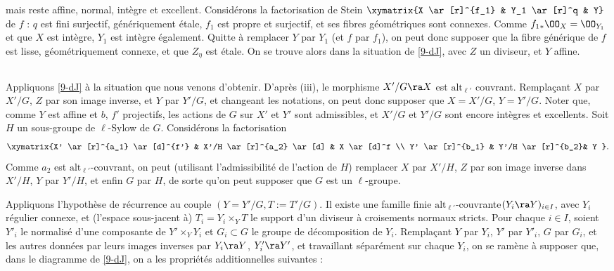 \documentclass[10pt]{../fichiers-configuration-latex/smfart}
\begin{document}
mais reste affine, normal, intègre et excellent. Considérons la factorisation de Stein $\xymatrix{X
\ar[r]^{f_1} & Y_1 \ar[r]^q & Y}$ de $f$ : $q$ est fini surjectif, génériquement étale, $f_1$ est
propre et surjectif, et ses fibres géométriques sont connexes. Comme $f_1{}_*\OO_X =
\OO_{Y_1}$ et que $X$ est intègre, $Y_1$ est intègre également. Quitte à remplacer $Y$ par
$Y_1$ (et $f$ par $f_1$), on peut donc supposer que la fibre générique de $f$ est lisse,
géométriquement connexe, et que $Z_{\eta}$ est étale. On se trouve alors dans la situation de
\ref{9-dJ}, avec $Z$ un diviseur, et $Y$ affine.  \subsection{}\label{9-récurrence} Appliquons
\ref{9-dJ} à la situation que nous venons d'obtenir. D'après (iii), le morphisme $X'/G \ra X$ est
$\mathrm{alt}_{\ell'}$ couvrant. Remplaçant $X$ par $X'/G$, $Z$ par son image inverse, et $Y$ par
$Y'/G$, et changeant les notations, on peut donc supposer que $X = X'/G$, $Y = Y'/G$. Noter que,
comme $Y$ est affine et $b$, $f'$ projectifs, les actions de $G$ sur $X'$ et $Y'$ sont admissibles,
et $X'/G$ et $Y'/G$ sont encore intègres et excellents. Soit $H$ un sous-groupe de $\ell$-Sylow de
$G$. Considérons la factorisation $$ \xymatrix{X' \ar[r]^{a_1} \ar[d]^{f'} & X'/H \ar[r]^{a_2}
\ar[d] & X \ar[d]^f \\ Y' \ar[r]^{b_1} & Y'/H \ar[r]^{b_2}& Y }.  $$ Comme $a_2$ est
$\mathrm{alt}_{\ell'}$-couvrant, on peut (utilisant l'admissibilité de l'action de $H$) remplacer
$X$ par $X'/H$, $Z$ par son image inverse dans $X'/H$, $Y$ par $Y'/H$, et enfin $G$ par $H$, de
sorte qu'on peut supposer que $G$ est un $\ell$-groupe.

Appliquons l'hypothèse de récurrence au couple $(Y = Y'/G,T := T'/G)$. Il existe une famille finie
$\mathrm{alt}_{\ell'}$-couvrante$(Y_i \ra Y)_{i \in I}$, avec $Y_i$ régulier connexe, et (l'espace
sous-jacent à) $T_i = Y_i \times_Y T$ le support d'un diviseur à croisements normaux stricts. Pour
chaque $i \in I$, soient $Y'_i$ le normalisé d'une composante de $Y' \times_Y Y_i$ et $G_i \subset
G$ le groupe de décomposition de $Y_i$. Remplaçant $Y$ par $Y_i$, $Y'$ par $Y'_i$, $G$ par $G_i$, et
les autres données par leurs images inverses par $Y_i \ra Y$, $Y'_i \ra Y'$, et travaillant
séparément sur chaque $Y_i$, on se ramène à supposer que, dans le diagramme de \ref{9-dJ}, on a les
propriétés additionnelles suivantes :
\end{document}
